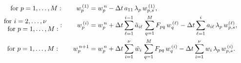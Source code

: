\begin{align}
        \text{for $p=1,\ldots,M$}: \qquad w^{ \, (1)}_p &= w^{ \, n}_p - {\Delta t} \, a_{11} \, \lambda_p \, w^{ \, (1)}_{p,s}, \\
       \begin{matrix} \text{for $i=2,\ldots,\nu$} \\ \text{ \quad \quad for $p=1,\ldots,M$}: \end{matrix} : \qquad w^{ \, (i)}_p &= w^{ \, n}_p + \Delta t \sum_{\ell = 1}^{i-1} \tilde{a}_{i\ell} \, \sum_{q=1}^M F_{pq} \, w^{ \, (\ell)}_q - {\Delta t} \sum_{\ell=1}^{i} a_{i\ell} \, \lambda_p \, w^{(\ell)}_{p,s}, \\
        \text{for $p=1,\ldots,M$}: \qquad  w_p^{ \, n+1} &= w^{ \, n}_p + \Delta t \sum_{i=1}^{\nu} \tilde{w}_i \, \sum_{q=1}^M F_{pq} \, w^{ \, (i)}_q - {\Delta t} \sum_{i = 1}^{\nu} w_i \, \lambda_p \, w^{ \, (i)}_{p,s}.
\end{align}
